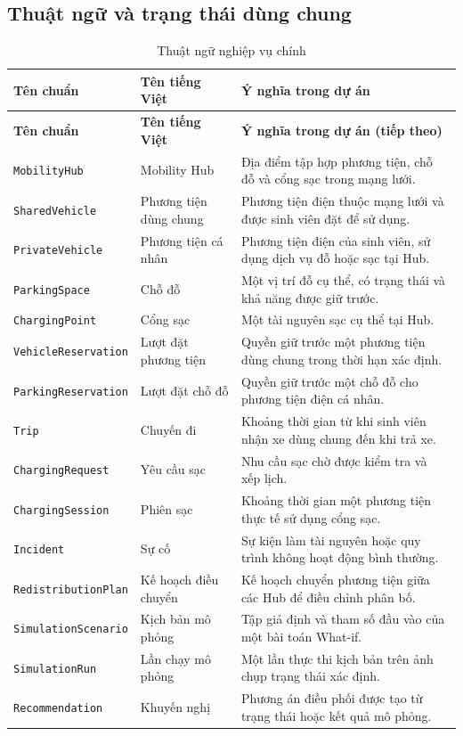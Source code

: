 \subsection{Thuật ngữ và trạng thái dùng chung}

\begingroup
\small
\begin{longtable}{|L{44mm}|L{34mm}|L{62mm}|}
  \caption{Thuật ngữ nghiệp vụ chính}\label{tab:business-terms}\\
  \hline
  \textbf{Tên chuẩn} & \centering\arraybackslash\textbf{Tên tiếng Việt} & \centering\arraybackslash\textbf{Ý nghĩa trong dự án}\\
  \hline
  \endfirsthead
  \hline
  \textbf{Tên chuẩn} & \centering\arraybackslash\textbf{Tên tiếng Việt} & \centering\arraybackslash\textbf{Ý nghĩa trong dự án (tiếp theo)}\\
  \hline
  \endhead
  \texttt{MobilityHub} & Mobility Hub & Địa điểm tập hợp phương tiện, chỗ đỗ và cổng sạc trong mạng lưới.\\
  \hline
  \texttt{SharedVehicle} & Phương tiện dùng chung & Phương tiện điện thuộc mạng lưới và được sinh viên đặt để sử dụng.\\
  \hline
  \texttt{PrivateVehicle} & Phương tiện cá nhân & Phương tiện điện của sinh viên, sử dụng dịch vụ đỗ hoặc sạc tại Hub.\\
  \hline
  \texttt{ParkingSpace} & Chỗ đỗ & Một vị trí đỗ cụ thể, có trạng thái và khả năng được giữ trước.\\
  \hline
  \texttt{ChargingPoint} & Cổng sạc & Một tài nguyên sạc cụ thể tại Hub.\\
  \hline
  \texttt{VehicleReservation} & Lượt đặt phương tiện & Quyền giữ trước một phương tiện dùng chung trong thời hạn xác định.\\
  \hline
  \texttt{ParkingReservation} & Lượt đặt chỗ đỗ & Quyền giữ trước một chỗ đỗ cho phương tiện điện cá nhân.\\
  \hline
  \texttt{Trip} & Chuyến đi & Khoảng thời gian từ khi sinh viên nhận xe dùng chung đến khi trả xe.\\
  \hline
  \texttt{ChargingRequest} & Yêu cầu sạc & Nhu cầu sạc chờ được kiểm tra và xếp lịch.\\
  \hline
  \texttt{ChargingSession} & Phiên sạc & Khoảng thời gian một phương tiện thực tế sử dụng cổng sạc.\\
  \hline
  \texttt{Incident} & Sự cố & Sự kiện làm tài nguyên hoặc quy trình không hoạt động bình thường.\\
  \hline
  \texttt{RedistributionPlan} & Kế hoạch điều chuyển & Kế hoạch chuyển phương tiện giữa các Hub để điều chỉnh phân bố.\\
  \hline
  \texttt{SimulationScenario} & Kịch bản mô phỏng & Tập giả định và tham số đầu vào của một bài toán What-if.\\
  \hline
  \texttt{SimulationRun} & Lần chạy mô phỏng & Một lần thực thi kịch bản trên ảnh chụp trạng thái xác định.\\
  \hline
  \texttt{Recommendation} & Khuyến nghị & Phương án điều phối được tạo từ trạng thái hoặc kết quả mô phỏng.\\
  \hline
\end{longtable}
\endgroup

